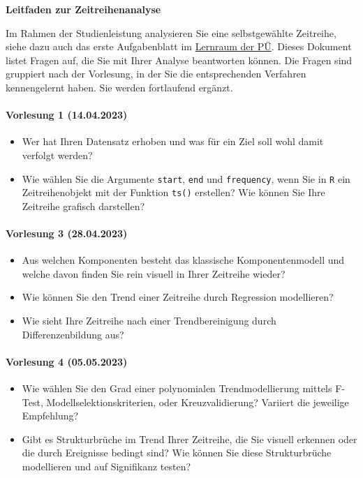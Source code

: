 \begin{center}
    \Large\sffamily
    \textbf{Leitfaden zur Zeitreihenanalyse}
\end{center}

Im Rahmen der Studienleistung analysieren Sie eine selbstgewählte Zeitreihe, siehe dazu auch das erste Aufgabenblatt im \href{https://moodle.uni-bielefeld.de/course/view.php?id=1035}{Lernraum der PÜ}. Dieses Dokument listet Fragen auf, die Sie mit Ihrer Analyse beantworten können. Die Fragen sind gruppiert nach der Vorlesung, in der Sie die entsprechenden Verfahren kennengelernt haben. Sie werden fortlaufend ergänzt.

\paragraph{Vorlesung 1 (14.04.2023)}
\begin{itemize}
    \item Wer hat Ihren Datensatz erhoben und was für ein Ziel soll wohl damit verfolgt werden?
    \item Wie wählen Sie die Argumente \texttt{start}, \texttt{end} und \texttt{frequency}, wenn Sie in \texttt{R} ein Zeitreihenobjekt mit der Funktion \texttt{ts()} erstellen? Wie können Sie Ihre Zeitreihe grafisch darstellen?
\end{itemize}

\paragraph{Vorlesung 3 (28.04.2023)}
\begin{itemize}
    \item Aus welchen Komponenten besteht das klassische Komponentenmodell und welche davon finden Sie rein visuell in Ihrer Zeitreihe wieder?
    \item Wie können Sie den Trend einer Zeitreihe durch Regression modellieren? 
    \item Wie sieht Ihre Zeitreihe nach einer Trendbereinigung durch Differenzenbildung aus?
\end{itemize}

\paragraph{Vorlesung 4 (05.05.2023)}
\begin{itemize}
    \item Wie wählen Sie den Grad einer polynomialen Trendmodellierung mittels F-Test, Modellselektionskriterien, oder Kreuzvalidierung? Variiert die jeweilige Empfehlung?
    \item Gibt es Strukturbrüche im Trend Ihrer Zeitreihe, die Sie visuell erkennen oder die durch Ereignisse bedingt sind? Wie können Sie diese Strukturbrüche modellieren und auf Signifikanz testen?
\end{itemize}

